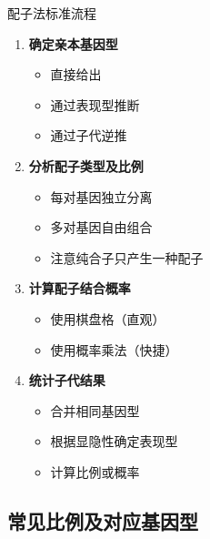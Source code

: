 \documentclass[a4paper,11pt]{ctexart}
\begin{document}
\begin{lemmabox}{配子法标准流程}
\begin{enumerate}[leftmargin=2em]
    \item \textbf{确定亲本基因型}
        \begin{itemize}
            \item 直接给出
            \item 通过表现型推断
            \item 通过子代逆推
        \end{itemize}
    \item \textbf{分析配子类型及比例}
        \begin{itemize}
            \item 每对基因独立分离
            \item 多对基因自由组合
            \item 注意纯合子只产生一种配子
        \end{itemize}
    \item \textbf{计算配子结合概率}
        \begin{itemize}
            \item 使用棋盘格（直观）
            \item 使用概率乘法（快捷）
        \end{itemize}
    \item \textbf{统计子代结果}
        \begin{itemize}
            \item 合并相同基因型
            \item 根据显隐性确定表现型
            \item 计算比例或概率
        \end{itemize}
\end{enumerate}
\end{lemmabox}

\subsection{常见比例及对应基因型}
\end{document}
